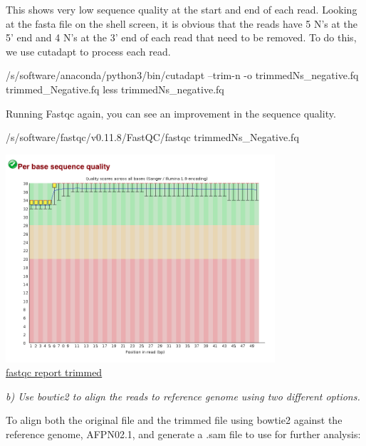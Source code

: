 \documentclass[]{article}
\newenvironment{Shaded}{\begin{snugshade}}{\end{snugshade}}
\newcommand{\FunctionTok}[1]{\textcolor[rgb]{0.00,0.00,0.00}{#1}}
\newcommand{\ExtensionTok}[1]{#1}
\newcommand{\NormalTok}[1]{#1}
\begin{document}
This shows very low sequence quality at the start and end of each read.
Looking at the fasta file on the shell screen, it is obvious that the
reads have 5 N's at the 5' end and 4 N's at the 3' end of each read that
need to be removed. To do this, we use cutadapt to process each read.

\begin{Shaded}
\begin{Highlighting}[]
\ExtensionTok{/s/software/anaconda/python3/bin/cutadapt}\NormalTok{ --trim-n -o trimmedNs_negative.fq trimmed_Negative.fq}
\FunctionTok{less}\NormalTok{ trimmedNs_negative.fq}
\end{Highlighting}
\end{Shaded}

Running Fastqc again, you can see an improvement in the sequence
quality.

\begin{Shaded}
\begin{Highlighting}[]
\ExtensionTok{/s/software/fastqc/v0.11.8/FastQC/fastqc}\NormalTok{ trimmedNs_Negative.fq}
\end{Highlighting}
\end{Shaded}

\includegraphics[width=0.75000\textwidth]{trimmedNs_negative_fastqc.png}\\

\href{/d/projects/u/sj003/course_materials/fastq/coursework_1/trimmedNs_Negative_fastqc.html}{fastqc
report trimmed}

\emph{b) Use bowtie2 to align the reads to reference genome using two
different options.}

To align both the original file and the trimmed file using bowtie2
against the reference genome, AFPN02.1, and generate a .sam file to use
for further analysis:
\end{document}
